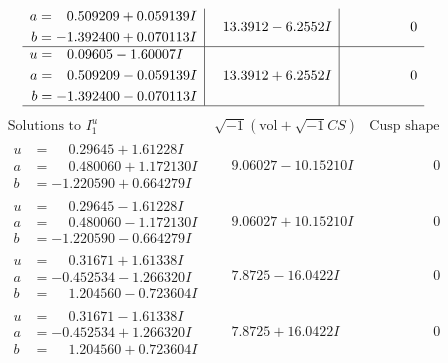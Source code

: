 \documentclass[1p]{elsarticle_modified}
\theoremstyle{definition}
\newcommand{\I}{\sqrt{-1}}
\begin{document}
$$\begin{array}{c|c|c}
\begin{aligned}
a &= \phantom{-}0.509209 + 0.059139 I \\
b &= -1.392400 + 0.070113 I\end{aligned}
 & \phantom{-}13.3912 - 6.2552 I & \phantom{-0.000000 } 0 \\ \hline\begin{aligned}
u &= \phantom{-}0.09605 - 1.60007 I \\
a &= \phantom{-}0.509209 - 0.059139 I \\
b &= -1.392400 - 0.070113 I\end{aligned}
 & \phantom{-}13.3912 + 6.2552 I & \phantom{-0.000000 } 0\\
 \hline 
 \end{array}$$\newpage$$\begin{array}{c|c|c}  
\text{Solutions to }I^u_{1}& \I (\text{vol} + \sqrt{-1}CS) & \text{Cusp shape}\\
 \hline 
\begin{aligned}
u &= \phantom{-}0.29645 + 1.61228 I \\
a &= \phantom{-}0.480060 + 1.172130 I \\
b &= -1.220590 + 0.664279 I\end{aligned}
 & \phantom{-}9.06027 - 10.15210 I & \phantom{-0.000000 } 0 \\ \hline\begin{aligned}
u &= \phantom{-}0.29645 - 1.61228 I \\
a &= \phantom{-}0.480060 - 1.172130 I \\
b &= -1.220590 - 0.664279 I\end{aligned}
 & \phantom{-}9.06027 + 10.15210 I & \phantom{-0.000000 } 0 \\ \hline\begin{aligned}
u &= \phantom{-}0.31671 + 1.61338 I \\
a &= -0.452534 - 1.266320 I \\
b &= \phantom{-}1.204560 - 0.723604 I\end{aligned}
 & \phantom{-}7.8725 - 16.0422 I & \phantom{-0.000000 } 0 \\ \hline\begin{aligned}
u &= \phantom{-}0.31671 - 1.61338 I \\
a &= -0.452534 + 1.266320 I \\
b &= \phantom{-}1.204560 + 0.723604 I\end{aligned}
 & \phantom{-}7.8725 + 16.0422 I & \phantom{-0.000000 } 0 \\ \hline\begin{aligned}

\end{aligned}
\end{array}$$
\end{document}
